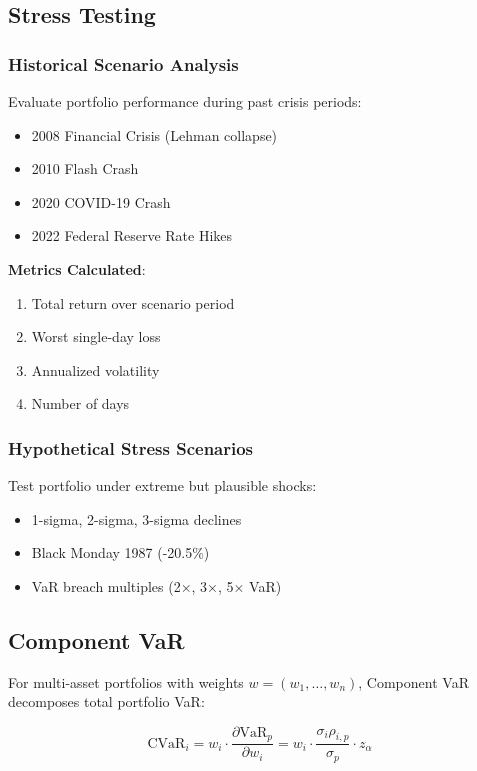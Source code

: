 \documentclass[12pt,a4paper]{article}
\begin{document}
\subsection{Stress Testing}

\subsubsection{Historical Scenario Analysis}

Evaluate portfolio performance during past crisis periods:
\begin{itemize}
    \item 2008 Financial Crisis (Lehman collapse)
    \item 2010 Flash Crash
    \item 2020 COVID-19 Crash
    \item 2022 Federal Reserve Rate Hikes
\end{itemize}

\textbf{Metrics Calculated}:
\begin{enumerate}
    \item Total return over scenario period
    \item Worst single-day loss
    \item Annualized volatility
    \item Number of days
\end{enumerate}

\subsubsection{Hypothetical Stress Scenarios}

Test portfolio under extreme but plausible shocks:
\begin{itemize}
    \item 1-sigma, 2-sigma, 3-sigma declines
    \item Black Monday 1987 (-20.5\%)
    \item VaR breach multiples (2×, 3×, 5× VaR)
\end{itemize}

\subsection{Component VaR}

For multi-asset portfolios with weights $w = (w_1, \ldots, w_n)$, Component VaR decomposes total portfolio VaR:

\begin{equation}
\text{CVaR}_i = w_i \cdot \frac{\partial \text{VaR}_p}{\partial w_i} = w_i \cdot \frac{\sigma_i \rho_{i,p}}{\sigma_p} \cdot z_\alpha
\end{equation}
\end{document}
